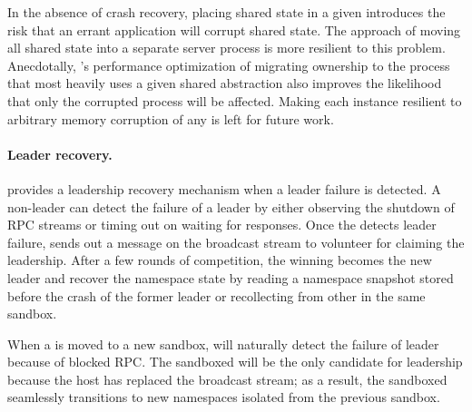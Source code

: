 In the absence of crash recovery, placing shared state in a given \picoproc{} introduces the risk that an errant 
application will corrupt shared \libos{} state.  The \microkernel{} approach of 
moving all shared state into a separate server process is more resilient to this problem.
Anecdotally, \thelibos{}'s performance optimization of migrating ownership to the process that 
most heavily uses a given shared abstraction also improves the likelihood that only the corrupted
process will be affected.  
Making each \thelibos{} instance resilient to arbitrary memory corruption of any \picoproc{} is left for future work.


\paragraph{Leader recovery.}
\thelibos{} provides a leadership recovery mechanism when a leader failure is detected.
A non-leader \picoproc{} can detect the failure of a leader by either observing the shutdown of RPC streams or timing out on waiting for responses. 
Once the \picoproc{} detects leader failure, \thelibos{} sends out a message on the broadcast stream to volunteer for claiming the leadership.
After a few rounds of competition, the winning \picoproc{} becomes the new leader and recover the namespace state by reading a namespace snapshot stored before the crash of the former leader
or recollecting from other \picoprocs{} in the same sandbox.


When a \picoproc{} is moved to a new sandbox, \thelibos{} will naturally detect the failure of leader because of blocked RPC. %
The sandboxed \picoproc{} will be the only candidate for leadership because the host has replaced the broadcast stream;
as a result, the sandboxed \picoproc{} seamlessly transitions to new namespaces isolated from the previous sandbox.


